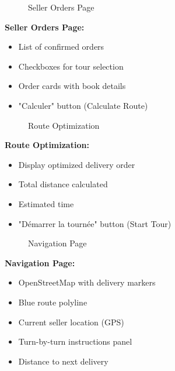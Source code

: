 \documentclass[12pt,a4paper]{article}
\begin{document}
\begin{figure}[h]
    \centering
    \caption{Seller Orders Page}
\end{figure}

\textbf{Seller Orders Page:}
\begin{itemize}
    \item List of confirmed orders
    \item Checkboxes for tour selection
    \item Order cards with book details
    \item "Calculer" button (Calculate Route)
\end{itemize}

\begin{figure}[h]
    \centering
    \caption{Route Optimization}
\end{figure}

\textbf{Route Optimization:}
\begin{itemize}
    \item Display optimized delivery order
    \item Total distance calculated
    \item Estimated time
    \item "Démarrer la tournée" button (Start Tour)
\end{itemize}

\begin{figure}[h]
    \centering
    \caption{Navigation Page}
\end{figure}

\textbf{Navigation Page:}
\begin{itemize}
    \item OpenStreetMap with delivery markers
    \item Blue route polyline
    \item Current seller location (GPS)
    \item Turn-by-turn instructions panel
    \item Distance to next delivery
\end{itemize}
\end{document}
